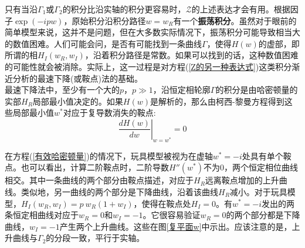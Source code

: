 只有当沿$\Gamma_1$或$\Gamma_2$的积分比沿实轴的积分更容易时，$\mathcal{Z}$的上述表达才会有用。根据因子$\exp(-ipw)$，原始积分沿积分路径$w=w_R$有一个\textbf{振荡积分}。虽然对于眼前的简单模型来说，这并不是问题，但在大多数实际情况下，振荡积分可能导致相当大的数值困难。人们可能会问，是否有可能找到一条曲线$\Gamma$，使得$H(w)$的虚部，即所谓的相$H_I(w_R,w_I)$，沿着积分路径是常数。如果可以找到的话，这种数值困难的可能性就会被消除。实际上，这一过程是对方程(\ref{Z的另一种表达式})这类积分渐近分析的最速下降(或鞍点)法的基础。\\

最速下降法中，至少有一个大的$p$，$p\gg1$，沿恒定相轮廓$\Gamma$的积分是由哈密顿量的实部$H_R$局部最小值决定的。如果$H(w)$是解析的，那么由柯西-黎曼方程得到这些局部最小值$w^*$对应于复导数消失的鞍点:\\
\begin{equation}
\left. \frac{dH(w)}{dw}\right|_{w=w^*} = 0 \label{复导数为0}
\end{equation}


在方程(\ref{有效哈密顿量})的情况下，玩具模型被视为在虚轴$w^* = -i$处具有单个鞍点。也可以看出，计算二阶鞍点时，二阶导数$H''(w^*)$不为0，两个恒定相位曲线相交。其中一条曲线的两个部分由鞍点描述，对应于$H_R$远离鞍点增加的上升曲线。类似地，另一曲线的两个部分是下降曲线，沿着该曲线$H_R$减小。对于玩具模型，$H_I(w_R,w_I) = p \ w_R(1+w_I)$，使得在鞍点处$H_I = 0$。有$w^* = -i$发出的两条恒定相曲线对应于$w_R=0$和$w_I=-1$。它很容易验证$w_R=0$的两个部分都是下降曲线，$w_I=-1$产生两个上升曲线。这些在图\ref{复平面w}中示出。应该注意的是，上升曲线与$\Gamma_2$的分段一致，平行于实轴。\\

